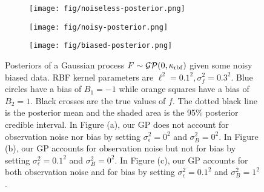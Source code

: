 \begin{figure}
    \centering
    \begin{subfigure}[b]{0.3\textwidth}
        \centering
        \texttt{[image: fig/noiseless-posterior.png]}
        \caption{}
        \label{subfig:noiseless-post}
    \end{subfigure}
    \hfill
    \begin{subfigure}[b]{0.3\textwidth}
        \centering
        \texttt{[image: fig/noisy-posterior.png]}
        \caption{}
        \label{subfig:noisy-posterior}
    \end{subfigure}
    \hfill
    \begin{subfigure}[b]{0.3\textwidth}
        \centering
        \texttt{[image: fig/biased-posterior.png]}
        \caption{}
        \label{subfig:biased-posterior}
    \end{subfigure}
    \hfill
    \caption{Posteriors of a Gaussian process $F \sim \mathcal{GP}(0, \kappa_{\mathrm{rbf}})$ given some noisy biased data.
    RBF kernel parameters are $\ell^{2} = 0.1^2, \sigma^2_{f} = 0.3 ^ 2$.
    Blue circles have a bias of $B_1 = -1$ while orange squares have a bias of $B_2 = 1$.
    Black crosses are the true values of $f$.
    The dotted black line is the posterior mean and the shaded area is the 95\% posterior credible interval.
    In Figure (a), our GP does not account for observation noise nor bias by setting $\sigma_{\epsilon}^2 = 0^2$ and $\sigma^2_B = 0^2$.
    In Figure (b), our GP accounts for observation noise but not for bias by setting $\sigma_{\epsilon}^2 = 0.1^2$ and $\sigma^2_B = 0^2$.
    In Figure (c), our GP accounts for both observation noise and for bias by setting $\sigma_{\epsilon}^2 = 0.1^2$ and $\sigma^2_B = 1^2$.
    }
    \label{fig:gp-posteriors}
\end{figure}
